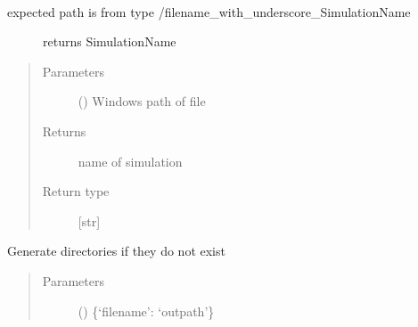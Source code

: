 \documentclass[a4paper,11pt,english]{sphinxmanual}
\begin{document}
\begin{fulllineitems}
\label{\detokenize{simulation_analysis:src.simulation_analysis.utility.extract_simulation_name}}~\begin{description}
\item[{expected path is from type /filename\_with\_underscore\_SimulationName}] \leavevmode
\sphinxAtStartPar
returns SimulationName

\end{description}
\begin{quote}\begin{description}
\item[{Parameters}] \leavevmode
\sphinxAtStartPar
{} () \textendash{} Windows path of file

\item[{Returns}] \leavevmode
\sphinxAtStartPar
name of simulation

\item[{Return type}] \leavevmode
\sphinxAtStartPar
{[}str{]}

\end{description}\end{quote}

\end{fulllineitems}


\begin{fulllineitems}
\label{\detokenize{simulation_analysis:src.simulation_analysis.utility.generate_missing_directories}}
\sphinxAtStartPar
Generate directories if they do not exist
\begin{quote}\begin{description}
\item[{Parameters}] \leavevmode
\sphinxAtStartPar
{} () \textendash{} \{‘filename’: ‘outpath’\}

\end{description}\end{quote}

\end{fulllineitems}
\end{document}
